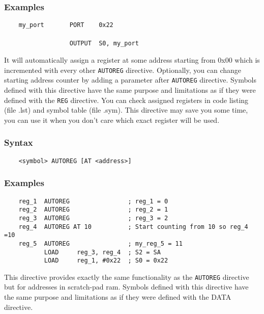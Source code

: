         \subsubsection{Examples}
            \verb'    my_port       PORT    0x22'\\
            \verb''\\
            \verb'                  OUTPUT  S0, my_port'

    \clearpage
        It will automatically assign a register at some address starting from 0x00 which is incremented with every other \texttt{AUTOREG} directive. Optionally, you can change starting address counter by adding a parameter after \texttt{AUTOREG} directive. Symbols defined with this directive have the same purpose and limitations as if they were defined with the \texttt{REG} directive. You can check assigned registers in code listing (file .lst) and symbol table (file .sym). This directive may save you some time, you can use it when you don't care which exact register will be used.

        \subsubsection{Syntax}
            \verb'    <symbol> AUTOREG [AT <address>]'

        \subsubsection{Examples}
            \verb'    reg_1  AUTOREG                ; reg_1 = 0'\\
            \verb'    reg_2  AUTOREG                ; reg_2 = 1'\\
            \verb'    reg_3  AUTOREG                ; reg_3 = 2'\\
            \verb'    reg_4  AUTOREG AT 10          ; Start counting from 10 so reg_4 =10'\\
            \verb'    reg_5  AUTOREG                ; my_reg_5 = 11'
            \verb''\\
            \verb'           LOAD     reg_3, reg_4  ; S2 = SA'\\
            \verb'           LOAD     reg_1, #0x22  ; S0 = 0x22'

        This directive provides exactly the same functionality as the \texttt{AUTOREG} directive but for addresses in scratch-pad ram. Symbols defined with this directive have the same purpose and limitations as if they were defined with the DATA directive.

